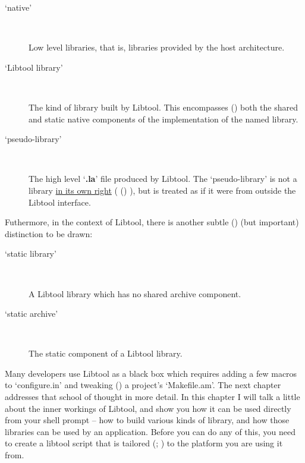 \begin{description}
\item[`native']
\ %

Low level libraries, that is, libraries provided by the host architecture. 

\item[`Libtool library']
\ %

The kind of library built by Libtool. This encompasses ({\MdQ{}}) both the shared 
and static native components of the implementation of the named library. 

\item[`pseudo-library']
\ %

The high level `\textbf{.la}' file produced by Libtool. The `pseudo-library' 
is not a library \underline{in its own right} ({\MfQ{}} ({\McQ{}}) ),
but is treated as if it were from 
outside the Libtool interface. 

\end{description}

Futhermore, in the 
context of Libtool, there is another subtle ({\McQ{}}) (but important) 
distinction to be drawn: 

\begin{description}

\item[`static library']
\ %

A Libtool library which has no shared archive component. 

\item[`static archive']
\ %

The static component of a Libtool library. 
\end{description}

Many developers use Libtool as a black box which requires adding a few macros 
to `configure.in' and tweaking ({\McQ{}}) a project's `Makefile.am'. The next 
chapter addresses that school of thought in more detail. In this chapter I 
will talk a little about the inner workings of Libtool, and show you how it 
can be used directly from your shell prompt -- how to build various kinds of 
library, and how those libraries can be used by an application. Before you can 
do any of this, you need to create a libtool script that is tailored ({\MaQ{}};
{\MaQ{}}) to the platform you are using it from. 

